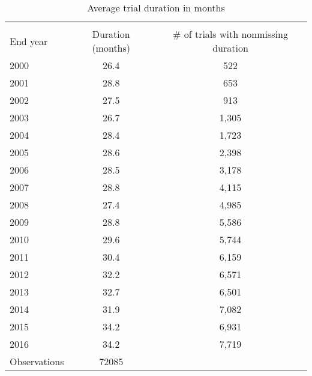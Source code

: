 \begin{table}[htbp]\centering
\caption{Average trial duration in months}
\begin{tabular}{l*{1}{cc}}
\hline\hline
                    &\multicolumn{2}{c}{}     \\
End year            &Duration (months)&\# of trials with nonmissing duration\\
\hline
2000                &        26.4&         522\\
2001                &        28.8&         653\\
2002                &        27.5&         913\\
2003                &        26.7&       1,305\\
2004                &        28.4&       1,723\\
2005                &        28.6&       2,398\\
2006                &        28.5&       3,178\\
2007                &        28.8&       4,115\\
2008                &        27.4&       4,985\\
2009                &        28.8&       5,586\\
2010                &        29.6&       5,744\\
2011                &        30.4&       6,159\\
2012                &        32.2&       6,571\\
2013                &        32.7&       6,501\\
2014                &        31.9&       7,082\\
2015                &        34.2&       6,931\\
2016                &        34.2&       7,719\\
\hline
Observations        &       72085&            \\
\hline\hline
\end{tabular}
\end{table}
